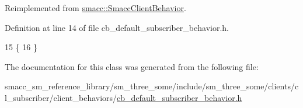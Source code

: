Reimplemented from \hyperlink{classsmacc_1_1SmaccClientBehavior_a7962382f93987c720ad432fef55b123f}{smacc\+::\+Smacc\+Client\+Behavior}.



Definition at line 14 of file cb\+\_\+default\+\_\+subscriber\+\_\+behavior.\+h.


\begin{DoxyCode}
15     \{
16     \}
\end{DoxyCode}


The documentation for this class was generated from the following file\+:\begin{DoxyCompactItemize}
\item 
smacc\+\_\+sm\+\_\+reference\+\_\+library/sm\+\_\+three\+\_\+some/include/sm\+\_\+three\+\_\+some/clients/cl\+\_\+subscriber/client\+\_\+behaviors/\hyperlink{cb__default__subscriber__behavior_8h}{cb\+\_\+default\+\_\+subscriber\+\_\+behavior.\+h}\end{DoxyCompactItemize}
